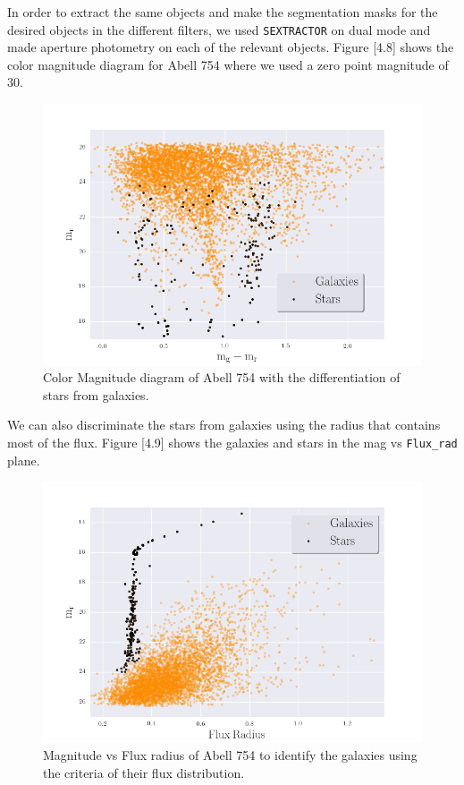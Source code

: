 In order to extract the same objects and make the segmentation masks for the desired objects in the different filters, we used \texttt{SEXTRACTOR} on dual mode and made aperture photometry on each of the relevant objects. Figure [4.8] shows the color magnitude diagram for Abell 754 where we used a zero point magnitude of 30.

\begin{figure}[H]
\centering
\includegraphics[width=12cm]{images/color_mag.png}
\caption[Color Magnitude diagram of Abell 754]{Color Magnitude diagram of Abell 754 with the differentiation of stars from galaxies.}
\end{figure}

We can also discriminate the stars from galaxies using the radius that contains most of the flux. Figure [4.9] shows the galaxies and stars in the mag vs \texttt{Flux\_rad} plane.

\begin{figure}[H]
\centering
\includegraphics[width=12cm]{images/mag_vs_flux_rad.png}
\caption[Magnitude vs Flux radius of Abell 754]{Magnitude vs Flux radius of Abell 754 to identify the galaxies using the criteria of their flux distribution.}
\end{figure}

